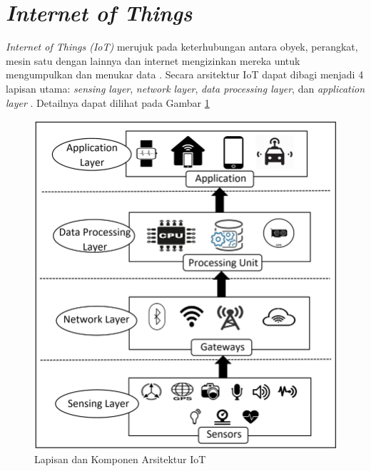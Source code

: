\section{\textit{Internet of Things}}

\textit{Internet of Things (IoT)} merujuk pada keterhubungan antara obyek, perangkat, mesin satu dengan lainnya dan internet mengizinkan mereka untuk mengumpulkan dan menukar data \parencite{inproc:gazis}. Secara arsitektur IoT dapat dibagi menjadi 4 lapisan utama: \textit{sensing layer}, \textit{network layer}, \textit{data processing layer}, dan \textit{application layer} \parencite{article:sikder}. Detailnya dapat dilihat pada Gambar \ref{fig:iot-architecture}

\begin{figure}[ht]
    \includegraphics[width=0.6\linewidth, center]{images/tinjauan-pustaka/fig-iot-architecture.png}
    \caption{Lapisan dan Komponen Arsitektur IoT \parencite{article:sikder}}
    \label{fig:iot-architecture}
\end{figure}


